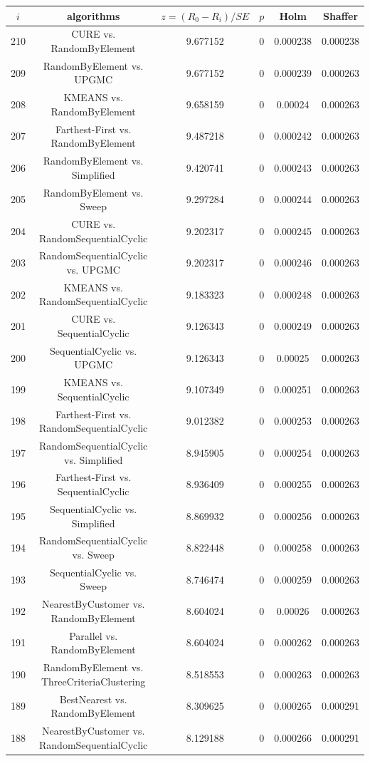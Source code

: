\documentclass[a4paper,10pt]{article}
\begin{document}
\begin{landscape}
\begin{table}[!htp]
\centering\scriptsize
\begin{tabular}{cccccc}
$i$&algorithms&$z=(R_0 - R_i)/SE$&$p$&Holm&Shaffer\\
\hline210&CURE vs. RandomByElement&9.677152&0&0.000238&0.000238\\
209&RandomByElement vs. UPGMC&9.677152&0&0.000239&0.000263\\
208&KMEANS vs. RandomByElement&9.658159&0&0.00024&0.000263\\
207&Farthest-First vs. RandomByElement&9.487218&0&0.000242&0.000263\\
206&RandomByElement vs. Simplified&9.420741&0&0.000243&0.000263\\
205&RandomByElement vs. Sweep&9.297284&0&0.000244&0.000263\\
204&CURE vs. RandomSequentialCyclic&9.202317&0&0.000245&0.000263\\
203&RandomSequentialCyclic vs. UPGMC&9.202317&0&0.000246&0.000263\\
202&KMEANS vs. RandomSequentialCyclic&9.183323&0&0.000248&0.000263\\
201&CURE vs. SequentialCyclic&9.126343&0&0.000249&0.000263\\
200&SequentialCyclic vs. UPGMC&9.126343&0&0.00025&0.000263\\
199&KMEANS vs. SequentialCyclic&9.107349&0&0.000251&0.000263\\
198&Farthest-First vs. RandomSequentialCyclic&9.012382&0&0.000253&0.000263\\
197&RandomSequentialCyclic vs. Simplified&8.945905&0&0.000254&0.000263\\
196&Farthest-First vs. SequentialCyclic&8.936409&0&0.000255&0.000263\\
195&SequentialCyclic vs. Simplified&8.869932&0&0.000256&0.000263\\
194&RandomSequentialCyclic vs. Sweep&8.822448&0&0.000258&0.000263\\
193&SequentialCyclic vs. Sweep&8.746474&0&0.000259&0.000263\\
192&NearestByCustomer vs. RandomByElement&8.604024&0&0.00026&0.000263\\
191&Parallel vs. RandomByElement&8.604024&0&0.000262&0.000263\\
190&RandomByElement vs. ThreeCriteriaClustering&8.518553&0&0.000263&0.000263\\
189&BestNearest vs. RandomByElement&8.309625&0&0.000265&0.000291\\
188&NearestByCustomer vs. RandomSequentialCyclic&8.129188&0&0.000266&0.000291\\

\end{tabular}
\end{table}
\end{landscape}
\end{document}

